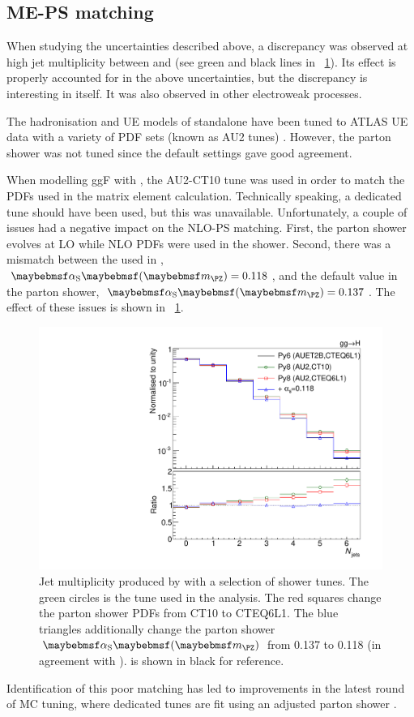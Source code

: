 \subsection{ME-PS matching}

When studying the uncertainties described above, a discrepancy was observed at high jet 
multiplicity between  and  (see 
green and black lines in \Figure~\ref{fig:signal:matching}). Its effect is properly 
accounted for in the above uncertainties, but the discrepancy is interesting in itself.
It was also observed in other electroweak processes.

The hadronisation and \ac{UE} models of standalone  have been tuned to ATLAS 
\ac{UE} data with a variety of \ac{PDF} sets (known as AU2 tunes) \cite{ATLAS:tune:2012}.
However, the parton shower was not tuned since the default settings gave good agreement. 

When modelling ggF with \powhegbox, the AU2-CT10 tune was used in order to match the 
\acp{PDF} used in the matrix element calculation. Technically speaking, a dedicated 
 tune should have been used, but this was unavailable. 
Unfortunately, a couple of issues had a negative impact on the NLO-PS matching. First, 
the parton shower evolves \alphaS at LO while NLO \acp{PDF} were used in the shower. 
Second, there was a mismatch between the \alphaS used in \powhegbox, 
$\alphaS\parenths{\mZ} = 0.118$, and the default value in the parton shower, 
$\alphaS\parenths{\mZ} = 0.137$. The effect of these issues is shown in 
\Figure~\ref{fig:signal:matching}.

\begin{figure}
	\includegraphics[width=\smallfigwidth]{tex/signal/matching}
	\caption{Jet multiplicity produced by  with a selection 
	of shower tunes. The green circles is the tune used in the analysis. The red squares 
	change the parton shower PDFs from CT10 to CTEQ6L1. The blue triangles additionally 
	change the parton shower $\alphaS\parenths{\mZ}$ from 0.137 to 0.118 (in agreement 
	with \powhegbox).  is shown in black for reference.}
	\label{fig:signal:matching}
\end{figure}

Identification of this poor matching has led to improvements in the latest round of MC 
tuning, where dedicated  tunes are fit using an adjusted 
parton shower \cite{ATLAS:tune:2013}.
